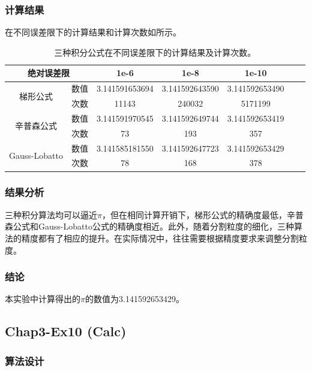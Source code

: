 \documentclass[12pt,a4paper]{article}
\begin{document}
\subsubsection{计算结果}

在不同误差限下的计算结果和计算次数如所示。

\begin{table}
    \centering
    \caption{三种积分公式在不同误差限下的计算结果及计算次数。}
    \label{tab:ex5_pi}
    \begin{tabular}{c|c|ccccc}
        \toprule
        \multicolumn{2}{c|}{绝对误差限} & 1e-6 & 1e-8 & 1e-10\tabularnewline
        \midrule
        \multirow{2}{*}{梯形公式} & 数值 & 3.141591653694 & 3.141592643590 &
        3.141592653490\tabularnewline
        & 次数 & 11143 & 240032 & 5171199\tabularnewline
        \hline
        \multirow{2}{*}{辛普森公式} & 数值 & 3.141591970545 & 3.141592649744 &
        3.141592653419\tabularnewline
        & 次数 & 73 & 193 & 357\tabularnewline
        \hline
        \multirow{2}{*}{Gauss-Lobatto} & 数值 & 3.141585181550 & 3.141592647723 &
        3.141592653429\tabularnewline
        & 次数 & 78 & 168 & 378\tabularnewline
        \bottomrule
    \end{tabular}
\end{table}

\subsubsection{结果分析}

三种积分算法均可以逼近$\pi$，但在相同计算开销下，梯形公式的精确度最低，辛普森公式和Gauss-Lobatto公式的精确度相近。此外，随着分割粒度的细化，三种算法的精度都有了相应的提升。在实际情况中，往往需要根据精度要求来调整分割粒度。

\subsubsection{结论}

本实验中计算得出的$\pi$的数值为3.141592653429。

\subsection{Chap3-Ex10 (Calc)}

\subsubsection{算法设计}
\end{document}

